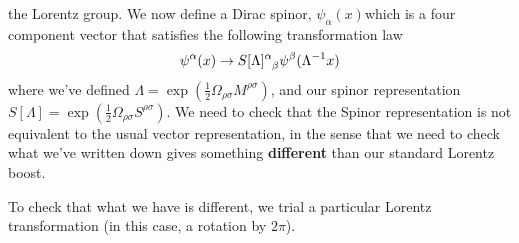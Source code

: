 the Lorentz group. 
We now define a Dirac spinor, $ \psi _ \alpha ( x) $which is a four component 
vector that satisfies the following transformation 
law 
\[
	\psi ^ \alpha ( x) \to  S[ \Lambda ] \indices{ ^ \alpha _ \beta } \psi ^ \beta ( 
	\Lambda ^{ - 1} x ) 
\] where we've defined $ \Lambda = \exp \left(  \frac{1}{2 } 
\Omega _{ \rho \sigma } M ^{ \rho \sigma } \right)  $, and 
our spinor representation $ S [ \Lambda ] = \exp \left(  
\frac{1}{2 } \Omega _{ \rho \sigma } S ^{ \rho \sigma } \right)  $. 
We need to check that the Spinor representation is not 
equivalent to the usual vector representation, in the
sense that we need to check what we've
written down gives something \textbf{different} than 
our standard Lorentz boost. 

To check that what we have is different, we trial a particular Lorentz transformation (in this case, a rotation by $ 2 \pi$). 

